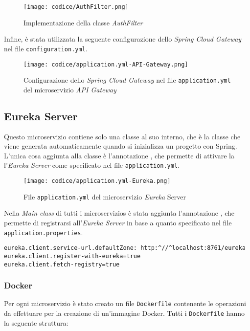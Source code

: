 \begin{figure}[H] 
    \centerline{\texttt{[image: codice/AuthFilter.png]}}
    \caption{Implementazione della classe \textit{AuthFilter}}
\end{figure}
\noindent Infine, è stata utilizzata la seguente configurazione dello \textit{Spring Cloud Gateway} nel file \texttt{configuration.yml}.
\begin{figure}[H] 
    \centering
    \texttt{[image: codice/application.yml-API-Gateway.png]} 
    \caption{Configurazione dello \textit{Spring Cloud Gateway} nel file \texttt{application.yml} del microservizio \textit{API Gateway}}
\end{figure}

\subsection{Eureka Server}
Questo \gls{microservizio} contiene solo una classe al suo interno, che è la classe che viene generata automaticamente quando si inizializza un progetto con Spring. L'unica cosa aggiunta alla classe è l'annotazione , che permette di  attivare la l'\textit{Eureka Server} come specificato nel file \texttt{application.yml}.
\begin{figure}[H] 
    \centering
    \texttt{[image: codice/application.yml-Eureka.png]} 
    \caption{File \texttt{application.yml} del microservizio \textit{Eureka} Server}
\end{figure}
\noindent Nella \textit{Main class} di tutti i \glspl{microservizio}  è stata aggiunta l'annotazione , che permette di registrarsi all'\textit{Eureka Server} in base a quanto specificato nel file \texttt{application.properties}.\\

\begin{lstlisting}[style=Docker, caption = {Configurazione per la registrazione di un microservizio all'\textit{Eureka Server} nel file \texttt{application.properties}}]
eureka.client.service-url.defaultZone: http:^//^localhost:8761/eureka
eureka.client.register-with-eureka=true
eureka.client.fetch-registry=true
\end{lstlisting}

\subsubsection{Docker}
Per ogni \gls{microservizio} è stato creato un file \texttt{Dockerfile} contenente le operazioni da effettuare per la creazione di un'immagine Docker.
Tutti i \texttt{Dockerfile} hanno la seguente struttura:

